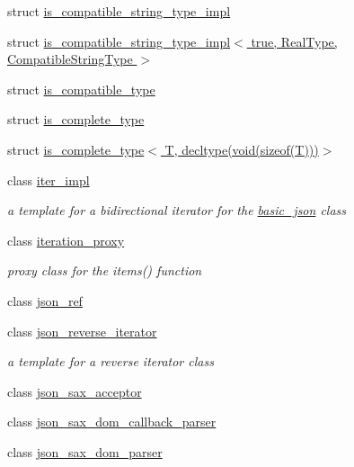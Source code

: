 \begin{DoxyCompactItemize}
\item 
struct \hyperlink{structnlohmann_1_1detail_1_1is__compatible__string__type__impl}{is\+\_\+compatible\+\_\+string\+\_\+type\+\_\+impl}
\item 
struct \hyperlink{structnlohmann_1_1detail_1_1is__compatible__string__type__impl_3_01true_00_01_real_type_00_01_compatible_string_type_01_4}{is\+\_\+compatible\+\_\+string\+\_\+type\+\_\+impl$<$ true, Real\+Type, Compatible\+String\+Type $>$}
\item 
struct \hyperlink{structnlohmann_1_1detail_1_1is__compatible__type}{is\+\_\+compatible\+\_\+type}
\item 
struct \hyperlink{structnlohmann_1_1detail_1_1is__complete__type}{is\+\_\+complete\+\_\+type}
\item 
struct \hyperlink{structnlohmann_1_1detail_1_1is__complete__type_3_01_t_00_01decltype_07void_07sizeof_07_t_08_08_08_4}{is\+\_\+complete\+\_\+type$<$ T, decltype(void(sizeof(\+T)))$>$}
\item 
class \hyperlink{classnlohmann_1_1detail_1_1iter__impl}{iter\+\_\+impl}
\begin{DoxyCompactList}\small\item\em a template for a bidirectional iterator for the \hyperlink{classnlohmann_1_1basic__json}{basic\+\_\+json} class \end{DoxyCompactList}\item 
class \hyperlink{classnlohmann_1_1detail_1_1iteration__proxy}{iteration\+\_\+proxy}
\begin{DoxyCompactList}\small\item\em proxy class for the items() function \end{DoxyCompactList}\item 
class \hyperlink{classnlohmann_1_1detail_1_1json__ref}{json\+\_\+ref}
\item 
class \hyperlink{classnlohmann_1_1detail_1_1json__reverse__iterator}{json\+\_\+reverse\+\_\+iterator}
\begin{DoxyCompactList}\small\item\em a template for a reverse iterator class \end{DoxyCompactList}\item 
class \hyperlink{classnlohmann_1_1detail_1_1json__sax__acceptor}{json\+\_\+sax\+\_\+acceptor}
\item 
class \hyperlink{classnlohmann_1_1detail_1_1json__sax__dom__callback__parser}{json\+\_\+sax\+\_\+dom\+\_\+callback\+\_\+parser}
\item 
class \hyperlink{classnlohmann_1_1detail_1_1json__sax__dom__parser}{json\+\_\+sax\+\_\+dom\+\_\+parser}

\end{DoxyCompactItemize}

